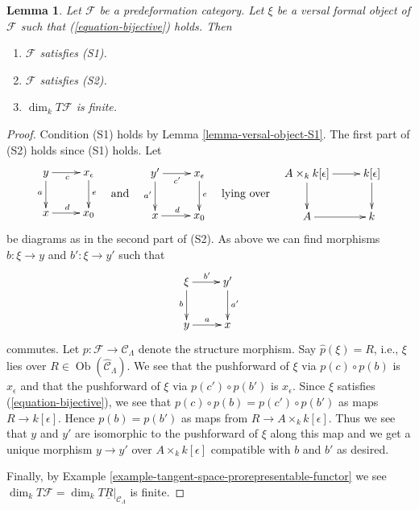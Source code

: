 \documentclass{stacks-project}
\theoremstyle{plain}
\newtheorem{lemma}[subsection]{Lemma}
\theoremstyle{definition}
\theoremstyle{remark}
\numberwithin{equation}{subsection}
\def\Ob{\mathop{\mathrm{Ob}}\nolimits}
\begin{document}
\begin{lemma}
\label{lemma-miniversal-object-existence-1}
Let $\mathcal{F}$ be a predeformation category.
Let $\xi$ be a versal formal object of $\mathcal{F}$ such that
(\ref{equation-bijective}) holds. Then
\begin{enumerate}
\item $\mathcal{F}$ satisfies (S1).
\item $\mathcal{F}$ satisfies (S2).
\item $\dim_k T\mathcal{F}$ is finite.
\end{enumerate}
\end{lemma}

\begin{proof}
Condition (S1) holds by
Lemma \ref{lemma-versal-object-S1}.
The first part of (S2) holds since (S1) holds. Let
$$
\vcenter{
\xymatrix{
y \ar[r]_c \ar[d]_a & x_\epsilon \ar[d]^e \\
x \ar[r]^d          & x_0
}
}
\quad\text{and}\quad
\vcenter{
\xymatrix{
y' \ar[r]_{c'} \ar[d]_{a'} & x_\epsilon \ar[d]^e \\
x \ar[r]^d                 & x_0
}
}
\quad\text{lying over}\quad
\vcenter{
\xymatrix{
A \times_k k[\epsilon] \ar[r] \ar[d] & k[\epsilon] \ar[d] \\
A  \ar[r] & k
}
}
$$
be diagrams as in the second part of (S2). As above we can find
morphisms $b : \xi \to y$ and $b' : \xi \to y'$ such that
$$
\xymatrix{
\xi \ar[r]^{b'} \ar[d]_b          & y' \ar[d]^{a'} \\
y \ar[r]^{a} & x
}
$$
commutes. Let $p : \mathcal{F} \to \mathcal{C}_\Lambda$ denote the
structure morphism. Say $\widehat{p}(\xi) = R$, i.e., $\xi$ lies over
$R \in \Ob(\widehat{\mathcal{C}}_\Lambda)$. We see that the
pushforward of $\xi$ via $p(c) \circ p(b)$ is $x_\epsilon$
and that the pushforward of $\xi$ via $p(c') \circ p(b')$ is $x_\epsilon$.
Since $\xi$ satisfies (\ref{equation-bijective}), we see that
$p(c) \circ p(b) = p(c') \circ p(b')$
as maps $R \to k[\epsilon]$. Hence $p(b) = p(b')$ as maps from
$R \to A \times_k k[\epsilon]$. Thus we see that $y$ and $y'$ are
isomorphic to the pushforward of $\xi$ along this map and we get
a unique morphism $y \to y'$ over $A \times_k k[\epsilon]$
compatible with $b$ and $b'$ as desired.

\medskip\noindent
Finally, by
Example \ref{example-tangent-space-prorepresentable-functor}
we see
$\dim_k T\mathcal{F} = \dim_k T\underline{R}|_{\mathcal{C}_\Lambda}$
is finite.
\end{proof}
\end{document}
